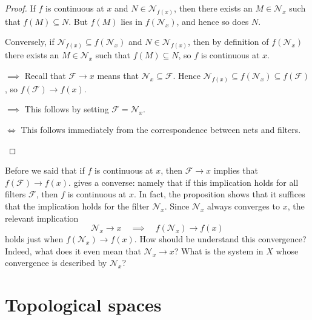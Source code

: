 \documentclass[article, a4paper, 11pt, oneside]{memoir}
\numberwithin{equation}{chapter}
\newcommand{\calF}{\mathcal{F}}
\newcommand{\calN}{\mathcal{N}}
\newcommand{\nhoods}[1]{\calN_{#1}}
\begin{document}
\begin{proof}
    If $f$ is continuous at $x$ and $N \in \nhoods{f(x)}$, then there exists an $M \in \nhoods{x}$ such that $f(M) \subseteq N$. But $f(M)$ lies in $f(\nhoods{x})$, and hence so does $N$.

    Conversely, if $\nhoods{f(x)} \subseteq f(\nhoods{x})$ and $N \in \nhoods{f(x)}$, then by definition of $f(\nhoods{x})$ there exists an $M \in \nhoods{x}$ such that $f(M) \subseteq N$, so $f$ is continuous at $x$.
%
\begin{proofsec}
    \item[\subcref{enum:continuity-point} $\implies$ \subcref{enum:filter-convergence-point}]
    Recall that $\calF \to x$ means that $\nhoods{x} \subseteq \calF$. Hence $\nhoods{f(x)} \subseteq f(\nhoods{x}) \subseteq f(\calF)$, so $f(\calF) \to f(x)$.

    \item[\subcref{enum:filter-convergence-point} $\implies$ \subcref{enum:continuity-point}]
    This follows by setting $\calF = \nhoods{x}$.

    \item[\subcref{enum:filter-convergence-point} $\Leftrightarrow$ \subcref{enum:net-convergence-point}]
    This follows immediately from the correspondence between nets and filters.
\end{proofsec}
\end{proof}

Before we said that if $f$ is continuous at $x$, then $\calF \to x$ implies that $f(\calF) \to f(x)$.  gives a converse: namely that if this implication holds for all filters $\calF$, then $f$ is continuous at $x$. In fact, the proposition shows that it suffices that the implication holds for the filter $\nhoods{x}$. Since $\nhoods{x}$ always converges to $x$, the relevant implication
%
\begin{equation*}
    \nhoods{x} \to x
    \quad \implies \quad
    f(\nhoods{x}) \to f(x)
\end{equation*}
%
holds just when $f(\nhoods{x}) \to f(x)$. How should be understand this convergence? Indeed, what does it even mean that $\nhoods{x} \to x$? What is the system in $X$ whose convergence is described by $\nhoods{x}$? %


\chapter{Topological spaces}
\end{document}
